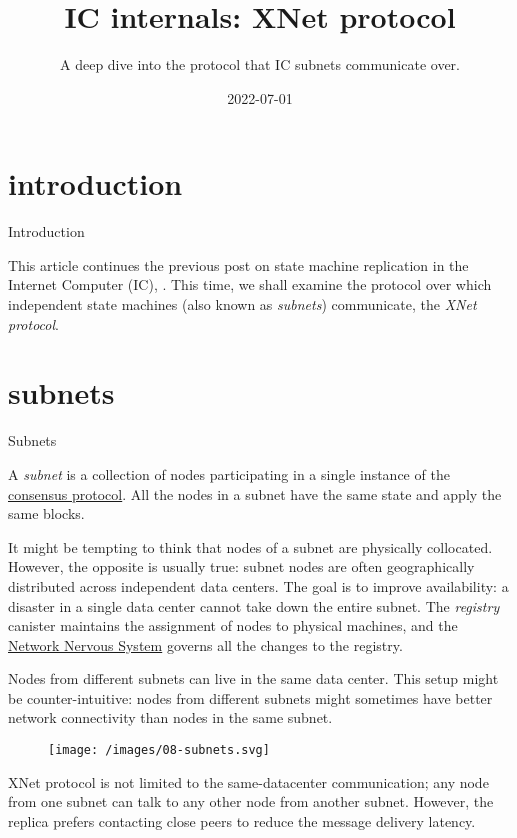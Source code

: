 \documentclass{article}
\title{IC internals: XNet protocol}
\subtitle{A deep dive into the protocol that IC subnets communicate over.}
\date{2022-07-01}
\begin{document}
\section{introduction}{Introduction}

This article continues the previous post on state machine replication in the Internet Computer (IC), .
This time, we shall examine the protocol over which independent state machines (also known as \emph{subnets}) communicate, the \emph{XNet protocol}.

\section{subnets}{Subnets}

A \emph{subnet} is a collection of nodes participating in a single instance of the \href{https://dfinity.org/howitworks/consensus}{consensus protocol}.
All the nodes in a subnet have the same state and apply the same blocks.

It might be tempting to think that nodes of a subnet are physically collocated.
However, the opposite is usually true: subnet nodes are often geographically distributed across independent data centers.
The goal is to improve availability: a disaster in a single data center cannot take down the entire subnet.
The \emph{registry} canister maintains the assignment of nodes to physical machines, and the \href{https://dfinity.org/howitworks/network-nervous-system-nns}{Network Nervous System} governs all the changes to the registry.

Nodes from different subnets can live in the same data center.
This setup might be counter-intuitive: nodes from different subnets might sometimes have better network connectivity than nodes in the same subnet.

\begin{figure}[grayscale-diagram]
  \texttt{[image: /images/08-subnets.svg]}
\end{figure}

XNet protocol is not limited to the same-datacenter communication; any node from one subnet can talk to any other node from another subnet.
However, the replica prefers contacting close peers to reduce the message delivery latency.
\end{document}
